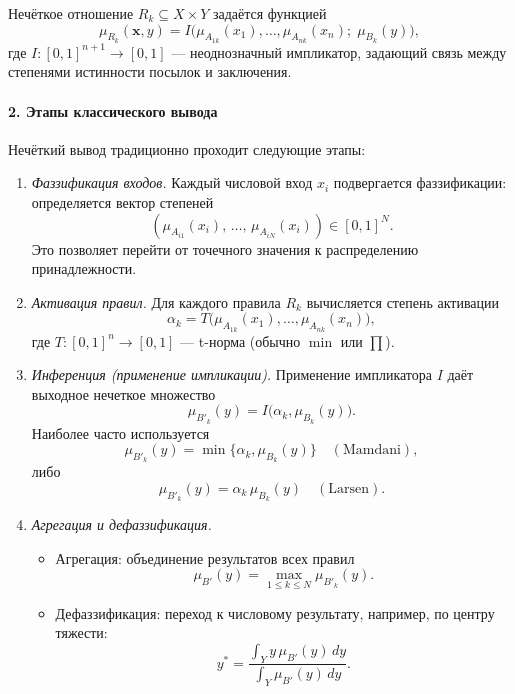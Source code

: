 \begin{definition}
Нечёткое отношение $R_k\subseteq X\times Y$ задаётся функцией
$$
  \mu_{R_k}(\mathbf{x},y)
  = I\bigl(\mu_{A_{1k}}(x_1),\dots,\mu_{A_{nk}}(x_n);\;\mu_{B_k}(y)\bigr),
$$
где $I:[0,1]^{n+1}\to[0,1]$ — неоднозначный импликатор, задающий связь
между степенями истинности посылок и заключения.
\end{definition}

\paragraph{2. Этапы классического вывода}
Нечёткий вывод традиционно проходит следующие этапы:

\begin{enumerate}
  \item \emph{Фаззификация входов.}
    Каждый числовой вход $x_i$ подвергается фаззификации:
    определяется вектор степеней
    $$
      (\mu_{A_{i1}}(x_i), \,\ldots, \,\mu_{A_{iN}}(x_i))
      \in [0,1]^N.
    $$
    Это позволяет перейти от точечного значения к распределению принадлежности.

  \item \emph{Активация правил.}
    Для каждого правила $R_k$ вычисляется степень активации
    \begin{equation}
      \alpha_k
      = T\bigl(\mu_{A_{1k}}(x_1),\dots,\mu_{A_{nk}}(x_n)\bigr),
      \label{eq:activation}
    \end{equation}
    где $T:[0,1]^n\to[0,1]$ — t-норма (обычно $\min$ или $\prod$).

  \item \emph{Инференция (применение импликации).}
    Применение импликатора $I$ даёт выходное нечеткое множество
    \begin{equation}
      \mu_{B'_k}(y)
      = I\bigl(\alpha_k,\mu_{B_k}(y)\bigr).
      \label{eq:inference}
    \end{equation}
    Наиболее часто используется
    $$
      \mu_{B'_k}(y)=\min\{\alpha_k,\mu_{B_k}(y)\}\quad(\text{Mamdani}),
    $$
    либо
    $$
      \mu_{B'_k}(y)=\alpha_k\,\mu_{B_k}(y)\quad(\text{Larsen}).
    $$

  \item \emph{Агрегация и дефаззификация.}
  \begin{itemize}
    \item Агрегация: объединение результатов всех правил
    $$
      \mu_{B'}(y)
      = \max_{1\le k\le N}\mu_{B'_k}(y).
    $$
    \item Дефаззификация: переход к числовому результату,
    например, по центру тяжести:
    \begin{equation}
      y^*
      = \displaystyle\frac{\int_Y y\,\mu_{B'}(y)\,dy}{\int_Y\mu_{B'}(y)\,dy}.
      \label{eq:defuzz_centroid}
    \end{equation}
  \end{itemize}
\end{enumerate}

